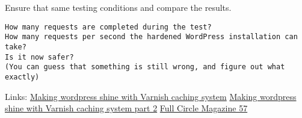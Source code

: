 Ensure that same testing conditions and compare the results.
\begin{Verbatim}[samepage=true,frame=single,
label=Discussion,framesep=2mm,rulecolor=\color{blue},commandchars=\\\{\}]
How many requests are completed during the test?
How many requests per second the hardened WordPress installation can take?
Is it now safer? 
(You can guess that something is still wrong, and figure out what exactly)
\end{Verbatim}

Links:
\href{http://kaanon.com/blog/work/making-wordpress-shine-varnish-caching-system-part-1}{Making wordpress shine with Varnish caching system}
\href{http://kaanon.com/blog/varnish/making-wordpress-shine-varnish-caching-system-part-2}{Making wordpress shine with Varnish caching system part 2}
\href{http://www.google.com/producer/editions/CAowvZtX/full_circle_magazine_57_lite}
{Full Circle Magazine 57}

